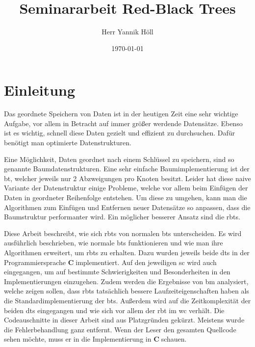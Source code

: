 \documentclass[11pt]{article}
\title{\textbf{Seminararbeit Red-Black Trees}}
\author{Herr Yannik Höll}
\date{\today}
\newcommand{\cpl}{\textbf{C}$\;$}
\begin{document}
\begin{titlingpage}
    \maketitle
\end{titlingpage}
\pagebreak

\tableofcontents
\pagebreak

\listoffigures
\pagebreak

\glsaddall
\printglossary
\pagebreak

\section{Einleitung}

Das geordnete Speichern von Daten ist in der heutigen Zeit eine sehr wichtige Aufgabe, vor allem in Betracht auf immer größer werdende Datensätze.
Ebenso ist es wichtig, schnell diese Daten gezielt und effizient zu durchsuchen. Dafür benötigt man optimierte Datenstrukturen. 

Eine Möglichkeit, Daten geordnet nach einem Schlüssel zu speichern, sind so genannte Baumdatenstrukturen.
Eine sehr einfache Baumimplementierung ist der \gls{bt}, welcher jeweils nur 2 Abzweigungen pro Knoten besitzt.
Leider hat diese naive Variante der Datenstruktur einige Probleme, welche vor allem beim Einfügen der Daten in geordneter Reihenfolge entstehen.
Um diese zu umgehen, kann man die Algorithmen zum Einfügen und Entfernen neuer Datensätze so anpassen, dass die Baumstruktur performanter wird.
Ein möglicher besserer Ansatz sind die \glspl{rbt}.

Diese Arbeit beschreibt, wie sich \glspl{rbt} von normalen \glspl{bt} unterscheiden. Es wird ausführlich beschrieben, wie normale \glspl{bt} funktionieren und wie man
ihre Algorithmen erweitert, um \glspl{rbt} zu erhalten.
Dazu wurden jeweils beide \glspl{dt} in der Programmiersprache \cpl implementiert. Auf den jeweiligen \gls{sc} wird auch eingegangen, um auf bestimmte Schwierigkeiten und Besonderheiten in den Implementierungen einzugehen.
Zudem werden die Ergebnisse von \gls{bm} analysiert, welche zeigen sollen, dass \glspl{rbt} tatsächlich bessere Laufzeiteigenschaften haben als
die Standardimplementierung der \glspl{bt}.
Außerdem wird auf die Zeitkomplexität der beiden \glspl{dt} eingegangen und wie sich vor allem der \gls{rbt} im \gls{wc} verhält.
Die Codeauschnitte in dieser Arbeit sind aus Platzgründen gekürzt. Meistens wurde die Fehlerbehandlung ganz entfernt.
Wenn der Leser den gesamten Quellcode sehen möchte, muss er in die Implementierung in \cpl schauen. 
\end{document}
